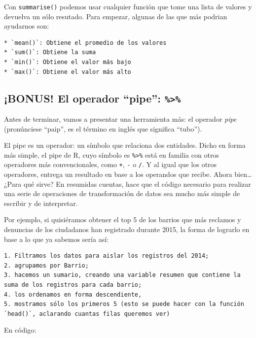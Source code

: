 \documentclass[]{book}
\begin{document}
Con \texttt{summarise()} podemos usar cualquier función que tome una
lista de valores y devuelva un sólo resutado. Para empezar, algunas de
las que más podrian ayudarnos son:

\begin{verbatim}
* `mean()`: Obtiene el promedio de los valores
* `sum()`: Obtiene la suma
* `min()`: Obtiene el valor más bajo
* `max()`: Obtiene el valor más alto
\end{verbatim}

\subsection{\texorpdfstring{¡BONUS! El operador ``pipe'':
\texttt{\%\textgreater{}\%}}{¡BONUS! El operador pipe: \%\textgreater{}\%}}\label{bonus-el-operador-pipe}

Antes de terminar, vamos a presentar una herramienta más: el operador
\emph{pipe} (pronúnciese ``paip'', es el término en inglés que significa
``tubo'').

El pipe es un operador: un símbolo que relaciona dos entidades. Dicho en
forma más simple, el pipe de R, cuyo símbolo es
\texttt{\%\textgreater{}\%} está en familia con otros operadores más
convencionales, como \texttt{+}, \texttt{-} o \texttt{/}. Y al igual que
los otros operadores, entrega un resultado en base a los operandos que
recibe. Ahora bien\ldots{} ¿Para qué sirve? En resumidas cuentas, hace
que el código necesario para realizar una serie de operaciones de
transformación de datos sea mucho más simple de escribir y de
interpretar.

Por ejemplo, si quisiéramos obtener el top 5 de los barrios que más
reclamos y denuncias de los ciudadanos han registrado durante 2015, la
forma de lograrlo en base a lo que ya sabemos sería así:

\begin{verbatim}
1. Filtramos los datos para aislar los registros del 2014;
2. agrupamos por Barrio;
3. hacemos un sumario, creando una variable resumen que contiene la suma de los registros para cada barrio;
4. los ordenamos en forma descendiente,
5. mostramos sólo los primeros 5 (esto se puede hacer con la función `head()`, aclarando cuantas filas queremos ver)
\end{verbatim}

En código:
\end{document}
